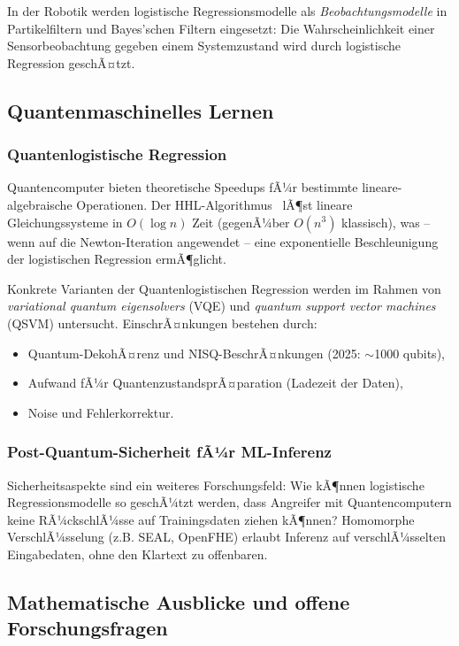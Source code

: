 ﻿\documentclass[12pt, a4paper]{article}
\theoremstyle{definition}
\theoremstyle{remark}
\begin{document}
In der Robotik werden logistische Regressionsmodelle als \emph{Beobachtungsmodelle} in
Partikelfiltern und Bayes'schen Filtern eingesetzt: Die Wahrscheinlichkeit einer Sensorbeobachtung
gegeben einem Systemzustand wird durch logistische Regression geschÃ¤tzt.

\subsection{Quantenmaschinelles Lernen}

\subsubsection{Quantenlogistische Regression}

Quantencomputer bieten theoretische Speedups fÃ¼r bestimmte lineare-algebraische Operationen.
Der HHL-Algorithmus~\citep{harrow2009quantum} lÃ¶st lineare Gleichungssysteme in
$O(\log n)$ Zeit (gegenÃ¼ber $O(n^3)$ klassisch), was -- wenn auf die Newton-Iteration
angewendet -- eine exponentielle Beschleunigung der logistischen Regression ermÃ¶glicht.

Konkrete Varianten der Quantenlogistischen Regression werden im Rahmen von
\emph{variational quantum eigensolvers} (VQE) und \emph{quantum support vector machines}
(QSVM) untersucht. EinschrÃ¤nkungen bestehen durch:
\begin{itemize}
  \item Quantum-DekohÃ¤renz und NISQ-BeschrÃ¤nkungen (2025: $\sim$1000 qubits),
  \item Aufwand fÃ¼r QuantenzustandsprÃ¤paration (Ladezeit der Daten),
  \item Noise und Fehlerkorrektur.
\end{itemize}

\subsubsection{Post-Quantum-Sicherheit fÃ¼r ML-Inferenz}

Sicherheitsaspekte sind ein weiteres Forschungsfeld: Wie kÃ¶nnen logistische
Regressionsmodelle so geschÃ¼tzt werden, dass Angreifer mit Quantencomputern keine
RÃ¼ckschlÃ¼sse auf Trainingsdaten ziehen kÃ¶nnen? Homomorphe VerschlÃ¼sselung (z.B. SEAL,
OpenFHE) erlaubt Inferenz auf verschlÃ¼sselten Eingabedaten, ohne den Klartext zu offenbaren.

\subsection{Mathematische Ausblicke und offene Forschungsfragen}
\end{document}
